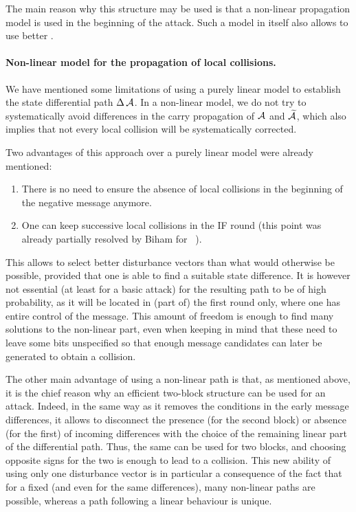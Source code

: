 The main reason why this structure may be used is that a non-linear propagation model is used in the beginning of the attack. Such a model in itself also allows to use
better \dvs.

\paragraph{Non-linear model for the propagation of local collisions.}
We have mentioned some limitations of using a purely linear model to establish the state differential path $\operatorname{\Delta}\mathcal{A}$. In a non-linear model, we do not
try to systematically avoid differences in the carry propagation of $\mathcal{A}$ and $\mathcal{\widetilde A}$, which also implies that not every local collision will be systematically
corrected.

Two advantages of this approach over a purely linear model were already mentioned:
\begin{enumerate}
\item There is no need to ensure the absence of local collisions in the beginning of the negative message anymore.
\item One can keep successive local collisions in the IF round (this point was already partially resolved by Biham \etal for \shazero~\cite{DBLP:conf/eurocrypt/BihamCJCLJ05}).
\end{enumerate}

This allows to select better disturbance vectors than what would otherwise be possible, provided that one is able to find a suitable state difference. It is however not
essential (at least for a basic attack) for the resulting path to be of high probability, as it will be located in (part of) the first round only, where one has entire
control of the message. This amount of freedom is enough to find many solutions to the non-linear part, even when keeping in mind that these need to leave some bits unspecified
so that enough message candidates can later be generated to obtain a collision.

The other main advantage of using a non-linear path is that, as mentioned above, it is the chief reason why an efficient two-block structure can be used for an attack. Indeed,
in the same way as it removes the conditions in the early message differences, it allows to disconnect the presence (for the second block) or absence (for the first)
of incoming \iv differences with the choice of the remaining linear part of the differential path. Thus, the same \dv can be used for two blocks, and choosing opposite signs for the two
is enough to lead to a collision. This new ability of using only one disturbance vector is in particular a consequence of the fact that for a fixed \dv (and even for the same \iv differences), many non-linear paths are possible,
whereas a path following a linear behaviour is unique.

